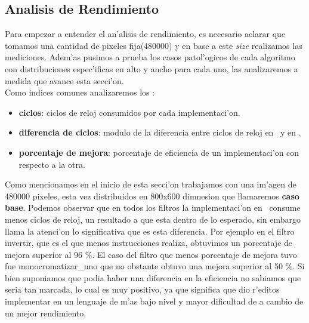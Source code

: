 \subsection{Analisis de Rendimiento}
Para empezar a entender el an'alisis de rendimiento, es necesario aclarar que tomamos una cantidad
de pixeles fija(480000) y en base a este \textit{size} realizamos las mediciones.
Adem'as pusimos a prueba los casos patol'ogicos de cada algoritmo con distribuciones espec'ificas en
alto y ancho para cada uno, las analizaremos a medida que avance esta secci'on.\\
Como indices comunes analizaremos los :\\
\begin{itemize}
 \item{} \textbf{ciclos}: ciclos de reloj consumidos por cada implementaci'on.
 \item{} \textbf{diferencia de ciclos}: modulo de la diferencia entre ciclos de reloj en \C \ y en \ass.
 \item{} \textbf{porcentaje de mejora}: porcentaje de eficiencia de un implementaci'on con respecto a la otra.
\end{itemize}
Como mencionamos en el inicio de esta secci'on trabajamos con una im'agen de 480000 pixeles, esta vez
distribuidos en 800x600 dimnesion que llamaremos \textbf{caso base}. Podemos observar que en todos los filtros 
la implementaci'on en \ass \ consume
menos ciclos de reloj, un resultado a que esta dentro de lo esperado, sin embargo llama la atenci'on
lo significativa que es esta diferencia. Por ejemplo en el filtro invertir, que es el que menos instrucciones
realiza, obtuvimos un porcentaje de mejora superior al 96 $\%$. El caso del filtro que menos porcentaje
de mejora tuvo fue monocromatizar_uno que no obstante obtuvo una mejora superior al 50 $\%$. Si bien
suponiamos que podia haber una diferencia en la eficiencia no sabiamos que seria tan marcada, lo cual es muy 
positivo, ya que significa que dio r'editos implementar en un lenguaje de m'as bajo nivel y mayor dificultad
de a cambio de un mejor rendimiento.\\
